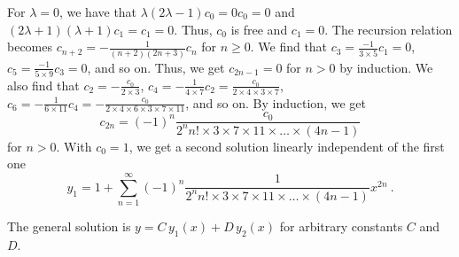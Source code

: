 \begin{egg}
For $\lambda = 0$, we have that
$\lambda( 2\lambda -1)c_0 = 0 c_0 = 0$ and
$(2\lambda+1)(\lambda+1) c_1 = c_1 = 0$.
Thus, $c_0$ is free and $c_1=0$. The recursion relation becomes
$\displaystyle c_{n+2} = -\frac{1}{(n+2)(2n+3)} c_n$
for $n \geq 0$.  We find that
$\displaystyle c_3 = \frac{-1}{3\times 5} c_1 = 0$,
$\displaystyle c_5 = \frac{-1}{5\times 9} c_3 = 0$, and so on.
Thus, we get $c_{2n-1} = 0$ for $n>0$ by induction.  We also find that
$\displaystyle c_2 = - \frac{c_0}{2\times 3}$,
$\displaystyle c_4 = - \frac{1}{4\times 7}c_2
= \frac{c_0}{2\times 4 \times 3 \times 7}$,
$\displaystyle c_6 = - \frac{1}{6\times 11}c_4
= -\frac{c_0}{2\times 4\times 6\times 3 \times 7 \times 11}$, and so on.
By induction, we get
\[
c_{2n} = (-1)^n \frac{c_0}{2^n n! \times 3 \times 7 \times 11 \times \ldots
\times (4n-1)}
\]
for $n > 0$.  With $c_0=1$, we get a second solution
linearly independent of the first one
\[
y_1 = 1+ \sum_{n=1}^\infty 
(-1)^n \frac{1}{2^n n! \times 3 \times 7 \times 11 \times \ldots
  \times (4n-1)}x^{2n} \ .
\]

The general solution is
$\displaystyle y = C\, y_1(x) + D\, y_2(x)$ for arbitrary constants
$C$ and $D$.
\end{egg}

